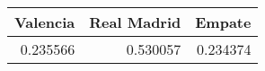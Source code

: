 \begin{tabular}{rrr}
\hline
   Valencia &   Real Madrid &   Empate \\
\hline
   0.235566 &      0.530057 & 0.234374 \\
\hline
\end{tabular}